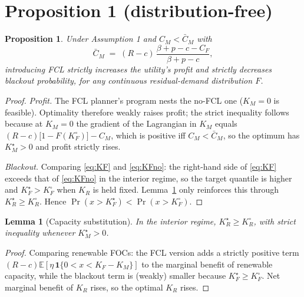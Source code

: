 \documentclass[11pt]{article}
\newtheorem{proposition}{Proposition}
\newtheorem{lemma}{Lemma}
\theoremstyle{definition}
\begin{document}
\section{Proposition 1 (distribution-free)}
\begin{proposition}\label{prop:1}
Under Assumption 1 and $C_M<\bar C_M$ with
\[
\bar C_M \;=\; (R-c)\,\frac{\beta+p-c-C_F}{\beta+p-c},
\]
introducing FCL strictly increases the utility's profit and strictly decreases blackout probability, for any continuous residual-demand distribution $F$.
\end{proposition}

\begin{proof}
\emph{Profit.} The FCL planner's program nests the no-FCL one ($K_M=0$ is feasible). Optimality therefore weakly raises profit; the strict inequality follows because at $K_M=0$ the gradient of the Lagrangian in $K_M$ equals $(R-c)\bigl[1-F(K_F^{\circ})\bigr]-C_M$, which is positive iff $C_M<\bar C_M$, so the optimum has $K_M^{\star}>0$ and profit strictly rises.

\emph{Blackout.} Comparing \eqref{eq:KF} and \eqref{eq:KFno}: the right-hand side of \eqref{eq:KF} exceeds that of \eqref{eq:KFno} in the interior regime, so the target quantile is higher and $K_F^{\star}>K_F^{\circ}$ when $K_R$ is held fixed. Lemma~\ref{lem:sub} only reinforces this through $K_R^{\star}\ge K_R^{\circ}$. Hence $\Pr(x>K_F^{\star})<\Pr(x>K_F^{\circ})$.
\end{proof}

\begin{lemma}[Capacity substitution]\label{lem:sub}
In the interior regime, $K_R^{\star}\ge K_R^{\circ}$, with strict inequality whenever $K_M^{\star}>0$.
\end{lemma}

\begin{proof}
Comparing renewable FOCs: the FCL version adds a strictly positive term $(R-c)\mathbb E[\eta\,\mathbf 1\{0<x<K_F-K_M\}]$ to the marginal benefit of renewable capacity, while the blackout term is (weakly) smaller because $K_F^{\star}\ge K_F^{\circ}$. Net marginal benefit of $K_R$ rises, so the optimal $K_R$ rises.
\end{proof}
\end{document}
